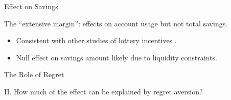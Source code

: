 \documentclass[aspectratio=169]{beamer}
\newenvironment{wideitemize}{\itemize\addtolength{\itemsep}{10pt}}{\enditemize}
\begin{document}
\begin{frame}{Effect on Savings}

	\begin{wideitemize}
		\item The ``extensive margin'': effects on account usage but not total savings.
		\begin{itemize}
			\item Consistent with other studies of lottery incentives \parencite{brune_effect_2015,gertler_long-term_2017}.
			\item Null effect on savings amount likely due to liquidity constraints.
		\end{itemize}
	\end{wideitemize}

\end{frame}

\begin{frame}{The Role of Regret}
	
	\centering \large II. How much of the effect can be explained by regret aversion?

\end{frame}



\end{document}

